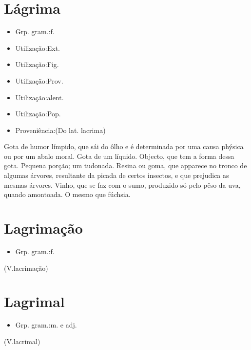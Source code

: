 \section{Lágrima}
\begin{itemize}
\item {Grp. gram.:f.}
\end{itemize}
\begin{itemize}
\item {Utilização:Ext.}
\end{itemize}
\begin{itemize}
\item {Utilização:Fig.}
\end{itemize}
\begin{itemize}
\item {Utilização:Prov.}
\end{itemize}
\begin{itemize}
\item {Utilização:alent.}
\end{itemize}
\begin{itemize}
\item {Utilização:Pop.}
\end{itemize}
\begin{itemize}
\item {Proveniência:(Do lat. \textunderscore lacrima\textunderscore )}
\end{itemize}
Gota de humor límpido, que sái do ôlho e é determinada por uma causa phýsica ou por um abalo moral.
Gota de um líquido.
Objecto, que tem a forma dessa gota.
Pequena porção; um tudonada.
Resina ou goma, que apparece no tronco de algumas árvores, resultante da picada de certos insectos, e que prejudica as mesmas árvores.
Vinho, que se faz com o sumo, produzido só pelo pêso da uva, quando amontoada.
O mesmo que \textunderscore fúchsia\textunderscore .
\section{Lagrimação}
\begin{itemize}
\item {Grp. gram.:f.}
\end{itemize}
(V.lacrimação)
\section{Lagrimal}
\begin{itemize}
\item {Grp. gram.:m.  e  adj.}
\end{itemize}
(V.lacrimal)

